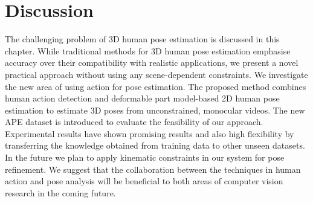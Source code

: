 

\section{Discussion}
\label{sec/body/conclusions}

The challenging problem of 3D human pose estimation is discussed in this chapter. 
While traditional methods for 3D human pose estimation emphasise accuracy over their compatibility with realistic applications, we present a novel practical approach without using any scene-dependent constraints.
We investigate the new area of using action for pose estimation. The proposed method combines human action detection and deformable part model-based 2D human pose estimation to estimate 3D poses from unconstrained, monocular videos.  
The new APE dataset is introduced to evaluate the feasibility of our approach.  
Experimental results have shown promising results and also high flexibility by transferring the knowledge obtained from training data to other unseen datasets.
In the future we plan to apply kinematic constraints in our system for pose refinement. 
We suggest that the collaboration between the techniques in human action and pose analysis will be beneficial to both areas of computer vision research in the coming future.  

